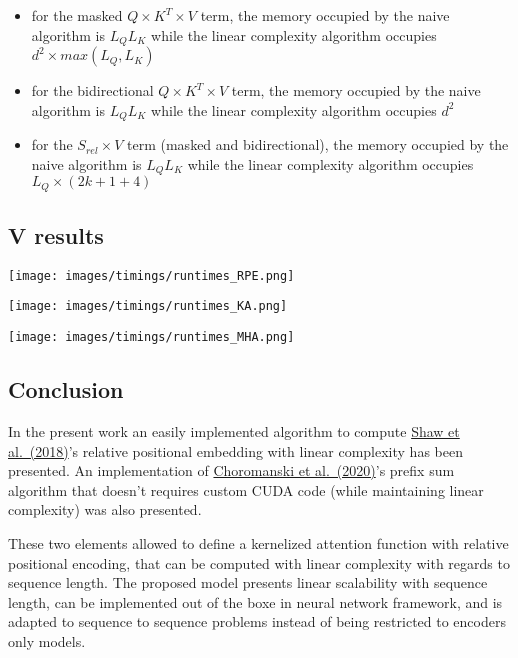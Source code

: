 \begin{itemize}
\tightlist
\item
  for the masked \(Q \times K^T \times V\) term, the memory occupied by
  the naive algorithm is \(L_QL_K\) while the linear complexity
  algorithm occupies \(d^2 \times max(L_Q, L_K)\)
\item
  for the bidirectional \(Q \times K^T \times V\) term, the memory
  occupied by the naive algorithm is \(L_QL_K\) while the linear
  complexity algorithm occupies \(d^2\)
\item
  for the \(S_{rel} \times V\) term (masked and bidirectional), the
  memory occupied by the naive algorithm is \(L_QL_K\) while the linear
  complexity algorithm occupies \(L_Q \times (2k+1 + 4)\)
\end{itemize}

\hypertarget{v-results}{%
\subsection{V results}\label{v-results}}

\texttt{[image: images/timings/runtimes\_RPE.png]}

\texttt{[image: images/timings/runtimes\_KA.png]}

\texttt{[image: images/timings/runtimes\_MHA.png]}

\hypertarget{conclusion}{%
\subsection{Conclusion}\label{conclusion}}

In the present work an easily implemented algorithm to compute
\href{https://arxiv.org/abs/1803.02155}{Shaw et al.~(2018)}'s relative
positional embedding with linear complexity has been presented. An
implementation of \href{https://arxiv.org/abs/2009.14794}{Choromanski et
al.~(2020)}'s prefix sum algorithm that doesn't requires custom CUDA
code (while maintaining linear complexity) was also presented.

These two elements allowed to define a kernelized attention function
with relative positional encoding, that can be computed with linear
complexity with regards to sequence length. The proposed model presents
linear scalability with sequence length, can be implemented out of the
boxe in neural network framework, and is adapted to sequence to sequence
problems instead of being restricted to encoders only models.
